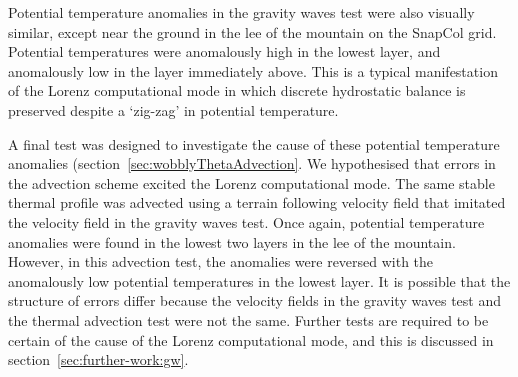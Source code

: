 Potential temperature anomalies in the gravity waves test were also visually similar, except near the ground in the lee of the mountain on the SnapCol grid.  Potential temperatures were anomalously high in the lowest layer, and anomalously low in the layer immediately above.  This is a typical manifestation of the Lorenz computational mode in which discrete hydrostatic balance is preserved despite a `zig-zag' in potential temperature.

A final test was designed to investigate the cause of these potential temperature anomalies (section~\ref{sec:wobblyThetaAdvection}.  We hypothesised that errors in the advection scheme excited the Lorenz computational mode.  The same stable thermal profile was advected using a terrain following velocity field that imitated the velocity field in the gravity waves test.  Once again, potential temperature anomalies were found in the lowest two layers in the lee of the mountain.  However, in this advection test, the anomalies were reversed with the anomalously low potential temperatures in the lowest layer.  It is possible that the structure of errors differ because the velocity fields in the gravity waves test and the thermal advection test were not the same.  Further tests are required to be certain of the cause of the Lorenz computational mode, and this is discussed in section~\ref{sec:further-work:gw}.

